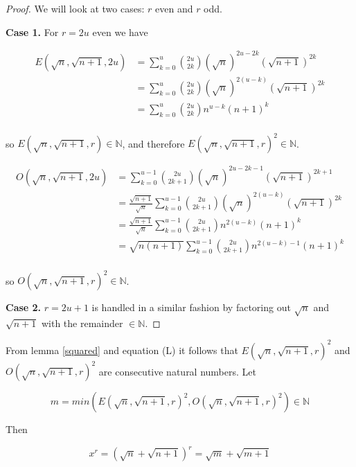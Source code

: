 \begin{proof}

\noindent We will look at two cases: $r$ even and $r$ odd.

\noindent \textbf{Case 1.} For $r = 2 u$ even we have

\begin{align*}
E(\sqrt{n}, \sqrt{n + 1}, 2 u) &=  \sum_{k = 0}^u  \binom{2 u}{2 k} (\sqrt{n})^{2 u - 2 k} (\sqrt{n + 1})^{2 k} \\
&=  \sum_{k = 0}^u  \binom{2 u}{2 k} (\sqrt{n})^{2 (u - k)} (\sqrt{n + 1})^{2 k} \\
&=  \sum_{k = 0}^u  \binom{2 u}{2 k} n^{u - k} (n + 1)^k \\
\end{align*}

\noindent so $E(\sqrt{n}, \sqrt{n + 1}, r) \in \mathbb{N}$, and therefore $E(\sqrt{n}, \sqrt{n + 1}, r)^2 \in \mathbb{N}$.

\begin{align*}
O(\sqrt{n}, \sqrt{n + 1}, 2 u) &=  \sum_{k = 0}^{u - 1}  \binom{2 u}{2 k + 1} (\sqrt{n})^{2 u - 2 k - 1} (\sqrt{n + 1})^{2 k + 1} \\
&=  \frac{\sqrt{n + 1}}{\sqrt{n}} \sum_{k = 0}^{u - 1}  \binom{2 u}{2 k + 1} (\sqrt{n})^{2 (u - k)} (\sqrt{n + 1})^{2 k} \\
&=  \frac{\sqrt{n + 1}}{\sqrt{n}} \sum_{k = 0}^{u - 1}  \binom{2 u}{2 k + 1} n^{2 (u - k)} (n + 1)^{k} \\
&=  \sqrt{n (n + 1)} \sum_{k = 0}^{u - 1}  \binom{2 u}{2 k + 1} n^{2 (u - k) - 1} (n + 1)^{k} \\
\end{align*}

\noindent so $O(\sqrt{n}, \sqrt{n + 1}, r)^2 \in \mathbb{N}$.

\noindent \textbf{Case 2.}  $r = 2 u + 1$ is handled in a similar fashion by factoring out $\sqrt{n}$ and $\sqrt{n + 1}$ with the remainder $\in \mathbb{N}$.

\end{proof}

\noindent From lemma \ref{squared} and equation (L) it follows that  $E(\sqrt{n}, \sqrt{n + 1}, r)^2$ and $O(\sqrt{n}, \sqrt{n + 1}, r)^2$ are consecutive natural numbers. Let

\begin{equation*}
m = min(E(\sqrt{n}, \sqrt{n + 1}, r)^2, O(\sqrt{n}, \sqrt{n + 1}, r)^2) \in \mathbb{N}
\end{equation*}

\noindent Then

\begin{equation*}
x^r = (\sqrt{n} + \sqrt{n + 1})^r = \sqrt{m} + \sqrt{m + 1}
\end{equation*}
